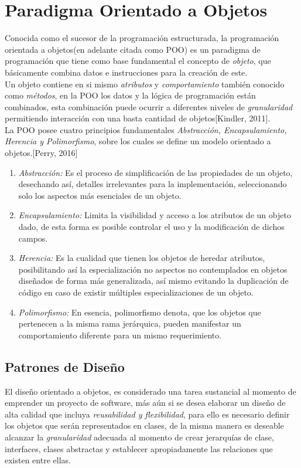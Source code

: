 \section {Paradigma Orientado a Objetos}
\noindent Conocida como el sucesor de la programación estructurada, la programación orientada a objetos(en adelante citada como POO)
\noindent es un paradigma de programación que tiene como base fundamental el concepto de \textit{objeto}, que básicamente combina datos
\noindent e instrucciones para la creación de este.\\
\noindent Un objeto contiene en si mismo \textit{atributos} y \textit{comportamiento} también conocido como \textit{métodos},
\noindent en la POO los datos y la lógica de programación están combinados, esta combinación puede ocurrir a diferentes niveles de
\noindent \textit{granularidad} permitiendo interacción con una basta cantidad de objetos[Kindler, 2011].\\
\noindent La POO posee cuatro principios fundamentales \textit{Abstracción, Encapsulamiento, Herencia y Polimorfismo},
\noindent sobre los cuales se define un modelo orientado a objetos.[Perry, 2016]\\
\begin{enumerate}
    \item \textit{Abstracción:} Es el proceso de  simplificación de las propiedades de un objeto,
          \noindent desechando así, detalles irrelevantes para la implementación, seleccionando solo los aspectos
          \noindent más esenciales de un objeto.
    \item \textit{Encapsulamiento:} Limita la visibilidad y acceso a los atributos de un objeto dado, de esta forma
          \nonident es posible controlar el uso y la modificación de dichos campos.
    \item \textit{Herencia:} Es la cualidad que tienen los objetos de heredar atributos, posibilitando así la especialización
          \nonindent no aspectos no contemplados en objetos diseñados de forma más generalizada, así mismo evitando la duplicación
          \nonindent de código en caso de existir múltiples especializaciones de un objeto.
    \item \textit{Polimorfismo:} En esencia, polimorfismo denota, que los objetos que pertenecen a la misma rama jerárquica,
           \nonindent pueden manifestar un comportamiento diferente para un mismo requerimiento.
\end{enumerate}
\subsection {Patrones de Diseño}
\noindent El diseño orientado a objetos, es considerado una tarea sustancial al momento de emprender un proyecto de software,
\noindent más aún si se desea elaborar un diseño de alta calidad que incluya \textit{reusabilidad y flexibilidad}, para ello es necesario
\noindent definir los objetos que serán representados en clases, de la misma manera es deseable alcanzar la \textit{granularidad}
\noindent adecuada al momento de crear jerarquías de clase, interfaces, clases abstractas y establecer apropiadamente las relaciones
\noindent que existen entre ellas.\\
